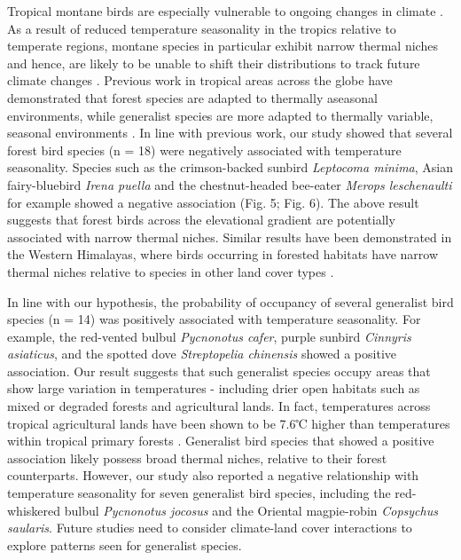 Tropical montane birds are especially vulnerable to ongoing changes in climate \citep{sekercioglu2007a,perez2016,freeman2018,srinivasan2018a}.
As a result of reduced temperature seasonality in the tropics relative to temperate regions, montane species in particular exhibit narrow thermal niches and hence, are likely to be unable to shift their distributions to track future climate changes \citep{janzen1967,deutsch2008,tewksbury2008,jankowski2013}.
Previous work in tropical areas across the globe have demonstrated that forest species are adapted to thermally aseasonal environments, while generalist species are more adapted to thermally variable, seasonal environments \citep{frishkoff2016,chan2016}.
In line with previous work, our study showed that several forest bird species (n = 18) were negatively associated with temperature seasonality.
Species such as the crimson-backed sunbird \textit{Leptocoma minima}, Asian fairy-bluebird \textit{Irena puella} and the chestnut-headed bee-eater \textit{Merops leschenaulti} for example showed a negative association (Fig. 5; Fig. 6).
The above result suggests that forest birds across the elevational gradient are potentially associated with narrow thermal niches.
Similar results have been demonstrated in the Western Himalayas, where birds occurring in forested habitats have narrow thermal niches relative to species in other land cover types \citep{srinivasan2019}.

In line with our hypothesis, the probability of occupancy of several generalist bird species (n = 14) was positively associated with temperature seasonality.
For example, the red-vented bulbul \textit{Pycnonotus cafer}, purple sunbird \textit{Cinnyris asiaticus}, and the spotted dove \textit{Streptopelia chinensis} showed a positive association.
Our result suggests that such generalist species occupy areas that show large variation in temperatures - including drier open habitats such as mixed or degraded forests and agricultural lands.
In fact, temperatures across tropical agricultural lands have been shown to be 7.6℃ higher than temperatures within tropical primary forests \citep{senior2017}.
Generalist bird species that showed a positive association likely possess broad thermal niches, relative to their forest counterparts.
However, our study also reported a negative relationship with temperature seasonality for seven generalist bird species, including the red-whiskered bulbul \textit{Pycnonotus jocosus} and the Oriental magpie-robin \textit{Copsychus saularis}.
Future studies need to consider climate-land cover interactions to explore patterns seen for generalist species.

